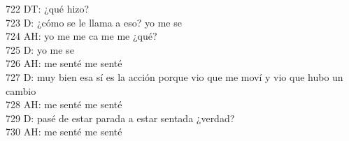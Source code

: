 722 DT: ¿qué hizo?\\
723 D: ¿cómo se le llama a eso? yo me se\\
724 AH: yo me me ca me me ¿qué?\\
725 D: yo me se\\
726 AH: me senté me senté\\
727 D: muy bien esa sí es la acción porque vio que me moví y vio que hubo un cambio\\
728 AH: me senté me senté\\
729 D: pasé de estar parada a estar sentada ¿verdad?\\
730 AH: me senté me senté\\
